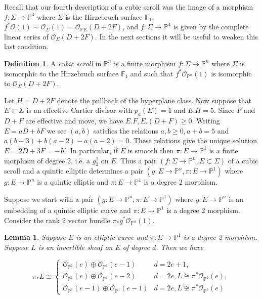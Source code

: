 \documentclass[amssymb,twoside,12 pt,amscd,reqno]{amsart}
\theoremstyle{plain}
\newtheorem{lem}[thm]{Lemma}
\theoremstyle{definition}
\newtheorem{defn}[thm]{Definition}
\newcommand{\PP}{\mathbb{P}}
\def\ps{\vspace{4pt}}
\newcommand{\lt}{\left}
\newcommand{\rt}{\right}
\newcommand{\OO}{\mathcal O}
\begin{document}
Recall that our fourth description of a cubic scroll was the image
of a morphism $f:\Sigma \rightarrow \PP^4$ where $\Sigma$ is the
Hirzebruch surface $\mathbb{F}_1$, $f^*\OO(1)\sim \OO_{\Sigma}(1) =
\OO_{\PP E}(D+2F)$, and $f:\Sigma \rightarrow \PP^4$ is given by the
complete linear series of $\OO_{\Sigma}(D+2F)$.  In the next 
sections it
will be useful to weaken this last condition.

\ps

\begin{defn} A \emph{cubic scroll} in $\PP^n$ is a finite morphism
$f:\Sigma\rightarrow \PP^n$ where $\Sigma$ is isomorphic to the
Hirzebruch surface $\mathbb{F}_1$ and such that $f^*\OO_{\PP^n}(1)$ is
isomorphic to $\OO_{\Sigma}(D+2F)$. 
\end{defn}

Let $H = D+2F$ denote the pullback of the hyperplane class.
Now suppose that $E\subset \Sigma$ is an effective Cartier divisor
with $p_a(E)=1$ and $E.H = 5$.  Since $F$ and $D+F$ are effective and
move, we have $E.F, E.(D+F) \geq 0$.  Writing $E=aD + bF$ we see
$(a,b)$ satisfies the relations $a,b \geq 0, a+b = 5$ and
$a(b-3)+b(a-2) -a(a-2) = 0$.  These relations give the unique solution
$E=2D+3F = -K$.  In particular, if $E$ is smooth then
$\pi:E\rightarrow \PP^1$ is a finite morphism of degree 2, i.e. a
$g^1_2$ on $E$.  Thus a pair $(f:\Sigma\rightarrow \PP^n, E\subset
\Sigma)$ of a cubic scroll and a quintic elliptic determines a pair
$(g:E\rightarrow \PP^n, \pi:E\rightarrow \PP^1)$ where $g:E\rightarrow
\PP^n$ is a quintic elliptic and $\pi:E\rightarrow \PP^1$ is a degree
2 morphism.  

\ps

Suppose we start with a pair $(g:E\rightarrow \PP^n, \pi:E\rightarrow
\PP^1)$ where $g:E\rightarrow \PP^n$ is an embedding of a quintic
elliptic curve and $\pi:E\rightarrow \PP^1$ is a degree 2 morphism.
Consider the rank 2 vector bundle $\pi_* g^* \OO_{\PP^n}(1)$.  

\ps

\begin{lem} Suppose $E$ is an elliptic curve and $\pi:E\rightarrow
\PP^1$ is a degree 2 morphism.  Suppose $L$ is an invertible sheaf on
$E$ of degree $d$.  Then we have

\begin{equation}
\pi_* L \cong \lt\{ \begin{array}{ll}
 \OO_{\PP^1}(e) \oplus \OO_{\PP^1}(e-1) & d = 2e+1, \\
 \OO_{\PP^1}(e) \oplus \OO_{\PP^1}(e-2) & d=2e, L\cong
        \pi^*\OO_{\PP^1}(e), \\
 \OO_{\PP^1}(e-1) \oplus \OO_{\PP^1}(e-1) & d=2e, L\not\cong \pi^*
        \OO_{\PP^1}(e) 
\end{array} \rt.
\end{equation}
\end{lem}
\end{document}
